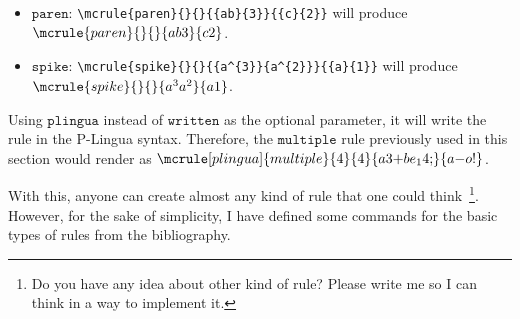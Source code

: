 \documentclass{article}
\begin{document}
\begin{itemize}
\begin{itemize}
\begin{itemize}
{        rules.}.
    \item \verb={{a}}=: The outer content of the ``main'' membrane is
      an object $a$.
    \item \verb=-= It writes down a $-$ symbol~\footnote{Also useful
        for creation/deletion rules in kP systems.}.
    \item \verb={{o}{!}}=: The symbol $!$ in the label is a reserved
      character to write down a guard $\{ o \}$~\footnote{Also used in
      kP systems.}.
    \end{itemize}
  \end{itemize}
\item $\mathtt{paren}$: \verb=\mcrule{paren}{}{}{{ab}{3}}{{c}{2}}=
  will produce $\mcrule{paren}{}{}{{ab}{3}}{{c}{2}}$.
\item $\mathtt{spike}$:
  \verb=\mcrule{spike}{}{}{{a^{3}}{a^{2}}}{{a}{1}}= will produce
  $\mcrule{spike}{}{}{{a^{3}}{a^{2}}}{{a}{1}}$.
\end{itemize}

Using $\mathtt{plingua}$ instead of
$\mathtt{written}$ as the optional parameter, it will write the rule
in the P-Lingua syntax. Therefore, the $\mathtt{multiple}$ rule
previously used in this section would render as\newline
$\mcrule[plingua]{multiple}{4}{4}{{{a}{3}{+}}{{b}}{{e_{1}}{4}}{;}}{{}{{a}}{-}{{o}{!}}}$.

With this, anyone can create almost any kind of rule that one could
think~\footnote{Do you have any idea about other kind of rule? Please
  write me so I can think in a way to implement it.}. However, for the
sake of simplicity, I have defined some commands for the basic types
of rules from the bibliography. 
\end{document}

